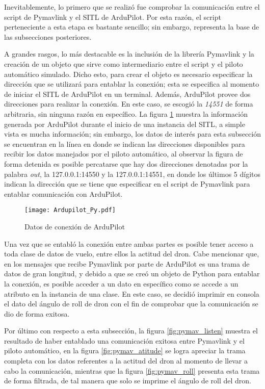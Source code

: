 Inevitablemente, lo primero que se realizó fue comprobar la comunicación entre el script de Pymavlink y el SITL de ArduPilot. Por esta razón, el script perteneciente a esta etapa es bastante sencillo; sin embargo, representa la base de las subsecciones posteriores.

A grandes rasgos, lo más destacable es la inclusión de la librería Pymavlink y la creación de un objeto que sirve como intermediario entre el script y el piloto automático simulado. Dicho esto, para crear el objeto es necesario especificar la dirección que se utilizará para entablar la conexión; esta se especifica al momento de iniciar el SITL de ArduPilot en un terminal. Además, ArduPilot provee dos direcciones para realizar la conexión. En este caso, se escogió la \textit{14551} de forma arbitraria, sin ninguna razón en específico. La figura \ref{fig:Ardupilot_Py} muestra la información generada por ArduPilot durante el inicio de una instancia del SITL, a simple vista es mucha información; sin embargo, los datos de interés para esta subsección se encuentran en la línea en donde se indican las direcciones disponibles para recibir los datos manejados por el piloto automático, al observar la figura de forma detenida es posible percatarse que hay dos direcciones denotadas por la palabra \textit{out}, la 127.0.0.1:14550 y la 127.0.0.1:14551, en donde los últimos 5 dígitos indican la dirección que se tiene que especificar en el script de Pymavlink para entablar comunicación con ArduPilot. 

\begin{figure}[ht]
    \centering
    \texttt{[image: Ardupilot\_Py.pdf]}
    \caption{Datos de conexión de ArduPilot}
    \label{fig:Ardupilot_Py}
\end{figure}

Una vez que se entabló la conexión entre ambas partes es posible tener acceso a toda clase de datos de vuelo, entre ellos la actitud del dron. Cabe mencionar que, en los mensajes que recibe Pymavlink por parte de ArduPilot es una trama de datos de gran longitud, y debido a que se creó un objeto de Python para entablar la conexión, es posible acceder a un dato en específico como se accede a un atributo en la instancia de una clase. En este caso, se decidió imprimir en consola el dato del ángulo de roll de dron con el fin de comprobar que la comunicación se dio de forma exitosa. 

Por último con respecto a esta subsección, la figura \ref{fig:pymav_listen} muestra el resultado de haber entablado una comunicación exitosa entre Pymavlink y el piloto automático, en la figura \ref{fig:pymav_atitude} se logra apreciar la trama completa con los datos referentes a la actitud del dron al momento de llevar a cabo la comunicación, mientras que la figura \ref{fig:pymav_roll} presenta esta trama de forma filtrada, de tal manera que solo se imprime el ángulo de roll del dron.
 


